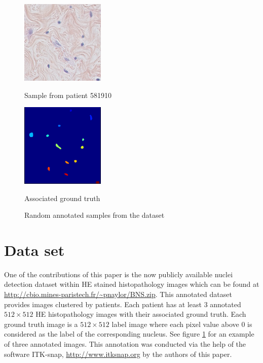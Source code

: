 \documentclass{article}
\begin{document}
\begin{figure}[htb]
\begin{minipage}[b]{.48\linewidth}
  \centering
  \centerline{\includegraphics[width=4.0cm]{RGB_3}}
  \centerline{Sample from patient 581910}\medskip
\end{minipage}
\hfill
\begin{minipage}[b]{0.48\linewidth}
  \centering
  \centerline{\includegraphics[width=4.0cm]{GT_3}}
  \centerline{Associated ground truth}\medskip
\end{minipage}
%
\caption{Random annotated samples from the dataset}
\label{fig:annotation}
%
\end{figure}


\section{Data set}
\label{sec:dataset}

\noindent One of the contributions of this paper is the now publicly available 
nuclei detection dataset within HE stained histopathology images which 
can be found at \url{http://cbio.mines-paristech.fr/~pnaylor/BNS.zip}. This annotated dataset provides images clustered by 
patients. Each patient has at least 3 annotated $512 \times 512$ HE 
histopathology images with their associated ground truth. Each 
ground truth image is a $512 \times 512$ label image where each pixel value above 
$0$ is considered as the label of the corresponding nucleus. 
See figure \ref{fig:annotation} for an example of 
three annotated images. This annotation was conducted via the help of 
the software ITK-snap, \cite{py06nimg} \url{http://www.itksnap.org} by
the authors of this paper. 
\end{document}
